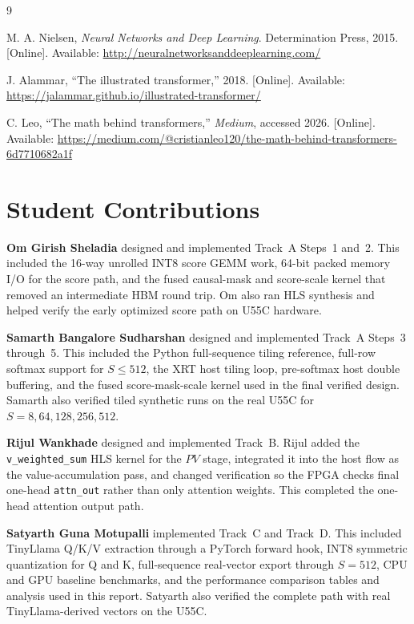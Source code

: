 \documentclass[conference]{IMSTemplate}
\begin{document}
\begin{thebibliography}{9}

M. A. Nielsen, \emph{Neural Networks and Deep Learning}. Determination Press,
2015. [Online]. Available: \url{http://neuralnetworksanddeeplearning.com/}

J. Alammar, ``The illustrated transformer,'' 2018. [Online]. Available:
\url{https://jalammar.github.io/illustrated-transformer/}

C. Leo, ``The math behind transformers,'' \emph{Medium}, accessed 2026.
[Online]. Available:
\url{https://medium.com/@cristianleo120/the-math-behind-transformers-6d7710682a1f}

\end{thebibliography}

\section{Student Contributions}

\textbf{Om Girish Sheladia} designed and implemented Track~A Steps~1 and~2. This included the
16-way unrolled INT8 score GEMM work, 64-bit packed memory I/O for the score
path, and the fused causal-mask and score-scale kernel that removed an
intermediate HBM round trip. Om also ran HLS synthesis and helped verify the
early optimized score path on U55C hardware.

\textbf{Samarth Bangalore Sudharshan} designed and implemented Track~A Steps~3 through~5. This
included the Python full-sequence tiling reference, full-row softmax support for
\(S\leq512\), the XRT host tiling loop, pre-softmax host double buffering, and the
fused score-mask-scale kernel used in the final verified design. Samarth also
verified tiled synthetic runs on the real U55C for \(S=8,64,128,256,512\).

\textbf{Rijul Wankhade} designed and implemented Track~B. Rijul added the
\texttt{v\_weighted\_sum} HLS kernel for the \(PV\) stage,
integrated it into the host flow as the value-accumulation pass, and changed
verification so the FPGA checks final one-head \texttt{attn\_out} rather than
only attention weights. This completed the one-head attention output path.

\textbf{Satyarth Guna Motupalli} implemented Track~C and Track~D. This included TinyLlama Q/K/V
extraction through a PyTorch forward hook, INT8 symmetric quantization for Q and
K, full-sequence real-vector export through \(S=512\), CPU and GPU baseline
benchmarks, and the performance comparison tables and analysis used in this
report. Satyarth also verified the complete path with real TinyLlama-derived
vectors on the U55C.
\end{document}
